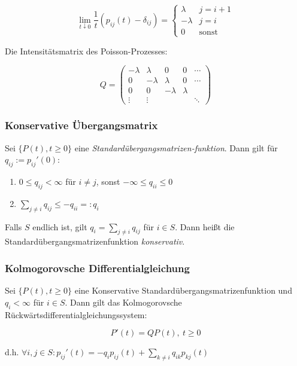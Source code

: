 \vspace*{-4mm}
$$\lim_{t\downarrow0} \frac{1}{t} (p_{ij}(t) - \delta_{ij}) = \begin{cases} \lambda & j = i+1 \\ -\lambda & j=i \\ 0 & \text{sonst}\end{cases}$$

Die Intensitätsmatrix des Poisson-Prozesses:

$$Q = \begin{pmatrix} -\lambda & \lambda & 0 & 0 & \cdots \\ 0 & -\lambda & \lambda & 0 & \cdots \\ 0 & 0 & -\lambda & \lambda & \\ \vdots & \vdots & & & \ddots \end{pmatrix}$$

\subsubsection*{Konservative Übergangsmatrix}

Sei $\{P(t),t \geq 0\}$ eine \emph{Standardübergangsmatrizen-funktion}. Dann gilt für $q_{ij}:=p_{ij}'(0)$:

\begin{enumerate}[label=(\alph*)]
	\item $0 \leq q_{ij} < \infty$ für $i \neq j$, sonst $-\infty \leq q_{ii} \leq 0$
	\item $\sum_{j\neq i} q_{ij} \leq -q_{ii} =: q_i$
\end{enumerate}

Falls $S$ endlich ist, gilt $q_i = \sum_{j\neq i} q_{ij}$ für $i \in S$. Dann heißt die Standardübergangsmatrizenfunktion \emph{konservativ}.

\subsubsection*{Kolmogorovsche Differentialgleichung}

Sei $\{P(t),t \geq 0\}$ eine Konservative Standardübergangsmatrizenfunktion und $q_i < \infty$ für $i \in S$. Dann gilt das Kolmogorovsche Rückwärtsdifferentialgleichungssystem:

\vspace*{-2mm}
$$P'(t) = QP(t), \ t \geq 0$$

d.h. $\forall i,j \in S : p_{ij}'(t) = -q_i p_{ij}(t) + \sum_{k \neq i} q_{ik} p_{kj}(t)$


